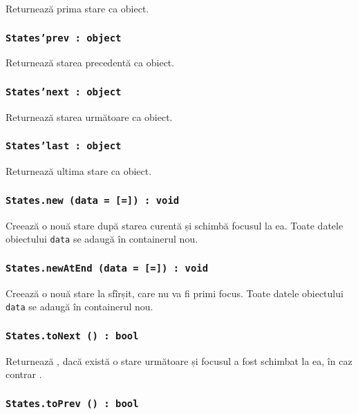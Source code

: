 Returnează prima stare ca obiect.

\subsubsection{\texttt{States'prev : object}}

Returnează starea precedentă ca obiect.

\subsubsection{\texttt{States'next : object}}

Returnează starea următoare ca obiect.

\subsubsection{\texttt{States'last : object}}

Returnează ultima stare ca obiect.

\subsubsection{\texttt{States.new (data = [=]) : void}}

Creează o nouă stare după starea curentă și schimbă focusul la ea. Toate datele obiectului \texttt{data} se adaugă în containerul nou.

\subsubsection{\texttt{States.newAtEnd (data = [=]) : void}}

Creează o nouă stare la sfîrșit, care nu va fi primi focus.  Toate datele obiectului \texttt{data} se adaugă în containerul nou.

\subsubsection{\texttt{States.toNext () : bool}}

Returnează \true, dacă există o stare următoare și focusul a fost schimbat la ea, în caz contrar \false.

\subsubsection{\texttt{States.toPrev () : bool}}

